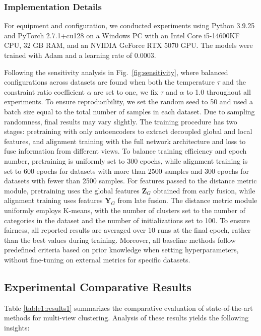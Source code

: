 \documentclass[10pt, journal, compsoc]{IEEEtran}
\newif\ifshowrevision
\newenvironment{revpar}{%
  \ifshowrevision
    \color{blue}%
  \fi
}{}
\begin{document}
\subsubsection{Implementation Details}

For equipment and configuration, we conducted experiments using Python 3.9.25 and PyTorch 2.7.1+cu128 on a Windows PC with an Intel Core i5-14600KF CPU, 32 GB RAM, and an NVIDIA GeForce RTX 5070 GPU. The models were trained with Adam and a learning rate of 0.0003.
\begin{revpar}
Following the sensitivity analysis in Fig.~\ref{fig:sensitivity}, where balanced configurations across datasets are found when both the temperature $\tau$ and the constraint ratio coefficient $\alpha$ are set to one, we fix $\tau$ and $\alpha$ to 1.0 throughout all experiments.
\end{revpar}
To ensure reproducibility, we set the random seed to 50 and used a batch size equal to the total number of samples in each dataset. Due to sampling randomness, final results may vary slightly.
The training procedure has two stages: pretraining with only autoencoders to extract decoupled global and local features, and alignment training with the full network architecture and loss to fuse information from different views. To balance training efficiency and epoch number, pretraining is uniformly set to 300 epochs, while alignment training is set to 600 epochs for datasets with more than 2500 samples and 300 epochs for datasets with fewer than 2500 samples. For features passed to the distance metric module, pretraining uses the global features $\boldsymbol{Z}_{G}$ obtained from early fusion, while alignment training uses features $\boldsymbol{Y}_{G}$ from late fusion. The distance metric module uniformly employs K-means\cite{macqueen1967multivariate}, with the number of clusters set to the number of categories in the dataset and the number of initializations set to 100. To ensure fairness, all reported results are averaged over 10 runs at the final epoch, rather than the best values during training. Moreover, all baseline methods follow predefined criteria based on prior knowledge when setting hyperparameters, without fine-tuning on external metrics for specific datasets.

\subsection{Experimental Comparative Results}
Table \ref{table1:results1} summarizes the comparative evaluation of state-of-the-art methods for multi-view clustering. Analysis of these results yields the following insights:
\end{document}
